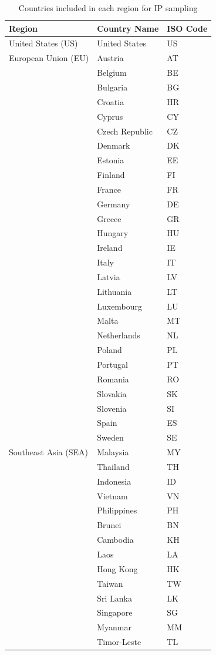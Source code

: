 \documentclass[sigconf,nonacm,screen,letterpaper,10pt]{acmart}
\begin{document}
\begin{table}[h]
\centering
\begin{tabular}{|l|l|l|}
\hline
\textbf{Region} & \textbf{Country Name} & \textbf{ISO Code} \\
\hline
United States (US) & United States & US \\
\hline
European Union (EU) & Austria & AT \\
 & Belgium & BE \\
 & Bulgaria & BG \\
 & Croatia & HR \\
 & Cyprus & CY \\
 & Czech Republic & CZ \\
 & Denmark & DK \\
 & Estonia & EE \\
 & Finland & FI \\
 & France & FR \\
 & Germany & DE \\
 & Greece & GR \\
 & Hungary & HU \\
 & Ireland & IE \\
 & Italy & IT \\
 & Latvia & LV \\
 & Lithuania & LT \\
 & Luxembourg & LU \\
 & Malta & MT \\
 & Netherlands & NL \\
 & Poland & PL \\
 & Portugal & PT \\
 & Romania & RO \\
 & Slovakia & SK \\
 & Slovenia & SI \\
 & Spain & ES \\
 & Sweden & SE \\
\hline
Southeast Asia (SEA) & Malaysia & MY \\
 & Thailand & TH \\
 & Indonesia & ID \\
 & Vietnam & VN \\
 & Philippines & PH \\
 & Brunei & BN \\
 & Cambodia & KH \\
 & Laos & LA \\
 & Hong Kong & HK \\
 & Taiwan & TW \\
 & Sri Lanka & LK \\
 & Singapore & SG \\
 & Myanmar & MM \\
 & Timor-Leste & TL \\
\hline
\end{tabular}
\caption{Countries included in each region for IP sampling}
\label{tab:regions-countries}
\end{table}
\end{document}

